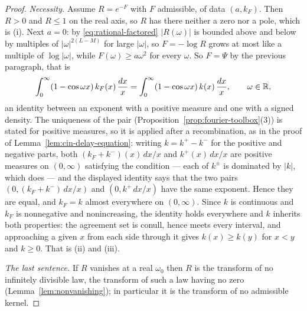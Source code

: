 \begin{proof}
\emph{Necessity.} Assume $R = e^{-F}$ with $F$ admissible, of data $(a,k_F)$. Then $R > 0$ and
$R \le 1$ on the real axis, so $R$ has there neither a zero nor a pole, which is (i). Next
$a = 0$: by \ref{eq:rational-factored} $|R(\omega)|$ is bounded above and below by multiples of
$|\omega|^{2(L-M)}$ for large $|\omega|$, so $F = -\log R$ grows at most like a multiple of
$\log|\omega|$, while $F(\omega) \ge a\omega^2$ for every $\omega$. So $F = \Psi$ by the previous
paragraph, that is
\[
  \int_0^\infty (1 - \cos\omega x)\,k_F(x)\,\frac{dx}{x}
   = \int_0^\infty (1 - \cos\omega x)\,k(x)\,\frac{dx}{x}, \qquad \omega \in \mathbb{R} ,
\]
an identity between an exponent with a positive \Levy{} measure and one with a signed density.
The uniqueness of the \Levy{} pair (Proposition~\ref{prop:fourier-toolbox}(3)) is stated for
positive measures, so it is applied after a recombination, as in the proof of
Lemma~\ref{lem:cin-delay-equation}: writing $k = k^{+} - k^{-}$ for the positive and negative
parts, both $(k_F + k^{-})(x)\,dx/x$ and $k^{+}(x)\,dx/x$ are positive measures on $(0,\infty)$
satisfying the \Levy{} condition --- each of $k^{\pm}$ is dominated by $|k|$, which does --- and
the displayed identity says that the two pairs $(0,(k_F+k^{-})\,dx/x)$ and $(0,k^{+}\,dx/x)$ have
the same exponent. Hence they are equal, and $k_F = k$ almost everywhere on $(0,\infty)$. Since
$k$ is continuous and $k_F$ is nonnegative and nonincreasing, the identity holds everywhere and
$k$ inherits both properties: the agreement set is conull, hence meets every interval, and
approaching a given $x$ from each side through it gives $k(x) \ge k(y)$ for $x < y$ and
$k \ge 0$. That is (ii) and (iii).

\emph{The last sentence.} If $R$ vanishes at a real $\omega_0$ then $R$ is the transform of no
infinitely divisible law, the transform of such a law having no zero
(Lemma~\ref{lem:nonvanishing}); in particular it is the transform of no admissible kernel.
\end{proof}

